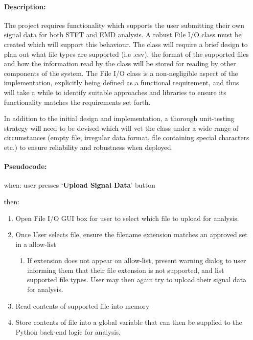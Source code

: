 \documentclass[
  paper=a4,
  ,captions=tableheading
]{scrartcl}
\providecommand{\tightlist}{%
  \setlength{\itemsep}{0pt}\setlength{\parskip}{0pt}}
\begin{document}
\hypertarget{description-3}{%
\paragraph{Description:}\label{description-3}}

The project requires functionality which supports the user submitting
their own signal data for both STFT and EMD analysis. A robust File I/O
class must be created which will support this behaviour. The class will
require a brief design to plan out what file types are supported (i.e
.csv), the format of the supported files and how the information read by
the class will be stored for reading by other components of the system.
The File I/O class is a non-negligible aspect of the implementation,
explicitly being defined as a functional requirement, and thus will take
a while to identify suitable approaches and libraries to ensure its
functionality matches the requirements set forth.

In addition to the initial design and implementation, a thorough
unit-testing strategy will need to be devised which will vet the class
under a wide range of circumstances (empty file, irregular data format,
file containing special characters etc.) to ensure reliability and
robustness when deployed.

\hypertarget{t5-file-io-asdf}{%
\paragraph{Pseudocode:\\}\label{t5-file-io-asdf}}

when: user presses `\textbf{Upload Signal Data}' button

then:

\begin{enumerate}
\def\labelenumi{\arabic{enumi}.}
\tightlist
\item
  Open File I/O GUI box for user to select which file to upload for
  analysis.
\item
  Once User selects file, ensure the filename extension matches an
  approved set in a allow-list 
\begin{enumerate}
	\item If extension does not appear on allow-list, present warning dialog to user informing them that their file extension is not supported, and list supported file types. User may then again try to upload their signal data for analysis.
\end{enumerate}
\item
  Read contents of supported file into memory
\item
  Store contents of file into a global variable that can then be
  supplied to the Python back-end logic for analysis.
\end{enumerate}
\end{document}
